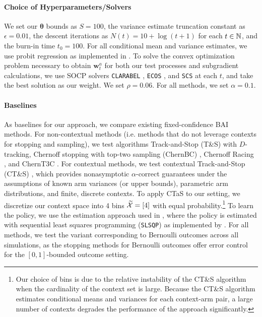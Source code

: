 \documentclass{article}
\begin{document}
\paragraph{Choice of Hyperparameters/Solvers} We set our $\bm{\theta}$ bounds as $S = 100$, the variance estimate truncation constant as $\epsilon = 0.01$, the descent iterations as $N(t) = 10 + \log(t + 1)$ for each $t \in \mathbb{N}$, and the burn-in time $t_0 = 100$. For all conditional mean and variance estimates, we use probit regression as implemented in \cite{seabold2010statsmodels}. To solve the convex optimization problem necessary to obtain $\bm{w}_t^a$ for both our test processes and subgradient calculations, we use SOCP solvers \texttt{CLARABEL} \citep{Clarabel_2024}, \texttt{ECOS} \citep{bib:Domahidi2013ecos}, and \texttt{SCS} \citep{odonoghue:21} at each $t$, and take the best solution as our weight. We set $\rho = 0.06$. For all methods, we set $\alpha = 0.1$.


\paragraph{Baselines}
As baselines for our approach, we compare existing fixed-confidence BAI methods. For non-contextual methods (i.e. methods that do not leverage contexts for stopping and sampling), we test algorithms Track-and-Stop (T\&S) \citep{garivier2016optimalbestarmidentification} with $D$-tracking, Chernoff stopping with top-two sampling (ChernBC) \citep{pmlr-v30-Kaufmann13}, Chernoff Racing \citep{garivier2016optimalbestarmidentification}, and ChernT3C \citep{3tc}. For contextual methods, we test contextual Track-and-Stop (CT\&S) \citep{kato2024rolecontextualinformationbest}, which provides nonasymptotic $\alpha$-correct guarantees under the assumptions of known arm variances (or upper bounds), parametric arm distributions, and finite, discrete contexts. To apply CTaS to our setting, we discretize our context space into 4 bins $\widetilde{\mathcal{X}}= [4]$  with equal probability.\footnote{Our choice of bins is due to the relative instability of the CT\&S algorithm when the cardinality of the context set is large. Because the CT\&S algorithm estimates conditional means and variances for each context-arm pair, a large number of contexts degrades the performance of the approach significantly.} To learn the policy, we use the estimation approach used in \cite{kato2024rolecontextualinformationbest}, where the policy is estimated with sequential least squares programming (\texttt{SLSQP}) as implemented by \cite{kraft1988software}. For all methods, we test the variant corresponding to Bernoulli outcomes across all simulations, as the stopping methods for Bernoulli outcomes offer error control for the $[0,1]$-bounded outcome setting. 
\end{document}
